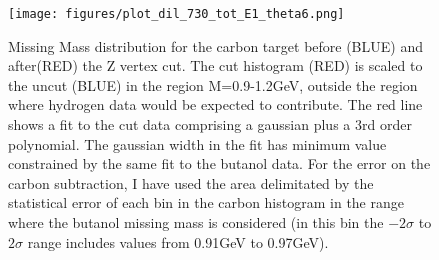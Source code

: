 \begin{figure}[H]
  \begin{center}
    \texttt{[image: figures/plot\_dil\_730\_tot\_E1\_theta6.png]} \\
    \caption{Missing Mass distribution for the carbon target before (BLUE) and after(RED) the Z vertex cut. The cut histogram (RED) is scaled to the uncut (BLUE) in the region M=0.9-1.2GeV, outside the region where hydrogen data would be expected to contribute. The red line shows a fit to the cut data comprising a gaussian plus a 3rd order polynomial. The gaussian width in the fit has minimum value constrained by the same fit to the butanol data.  
 For the error on the carbon subtraction, I have used the area delimitated by the statistical error of each bin in the carbon histogram in the range where the butanol missing mass is considered (in this bin the $-2\sigma$ to $2\sigma$ range includes values from 0.91GeV to 0.97GeV).}
    \label{fig:dilution_mass_zcut}
  \end{center}
\end{figure}



